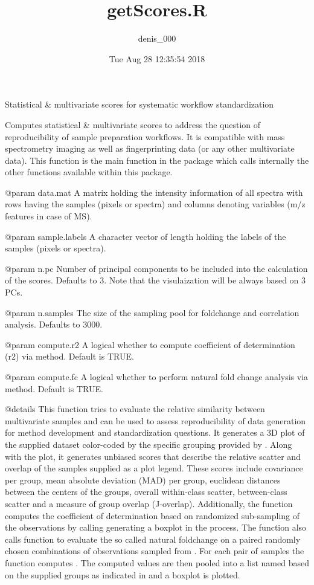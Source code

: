 \documentclass[]{article}
\title{getScores.R}
\author{denis\_000}
\date{Tue Aug 28 12:35:54 2018}
\begin{document}
\maketitle

Statistical \& multivariate scores for systematic workflow
standardization

Computes statistical \& multivariate scores to address the question of
reproducibility of sample preparation workflows. It is compatible with
mass spectrometry imaging as well as fingerprinting data (or any other
multivariate data). This function is the main function in the package
which calls internally the other functions available within this
package.

@param data.mat A matrix holding the intensity information of all
spectra with rows having the samples (pixels or spectra) and columns
denoting variables (m/z features in case of MS).

@param sample.labels A character vector of length
 holding the labels of the samples (pixels or
spectra).

@param n.pc Number of principal components to be included into the
calculation of the scores. Defaults to 3. Note that the visulaization
will be always based on 3 PCs.

@param n.samples The size of the sampling pool for foldchange and
correlation analysis. Defaults to 3000.

@param compute.r2 A logical whether to compute coefficient of
determination (r2) via  method. Default is TRUE.

@param compute.fc A logical whether to perform natural fold change
analysis via  method. Default is TRUE.

@details This function tries to evaluate the relative similarity between
multivariate samples and can be used to assess reproducibility of data
generation for method development and standardization questions. It
generates a 3D plot of the supplied dataset  color-coded
by the specific grouping provided by . Along with
the plot, it generates unbiased scores that describe the relative
scatter and overlap of the samples supplied as a plot legend. These
scores include covariance per group, mean absolute deviation (MAD) per
group, euclidean distances between the centers of the groups, overall
within-class scatter, between-class scatter and a measure of group
overlap (J-overlap). Additionally, the function computes the coefficient
of determination based on randomized sub-sampling of the observations by
calling  generating a boxplot in the process. The function
also calls  function to evaluate the so called natural
foldchange on a paired randomly chosen combinations of observations
sampled from . For each pair of samples the function
computes . The
computed values are then pooled into a list named based on the supplied
groups as indicated in  and a boxplot is plotted.
\end{document}
